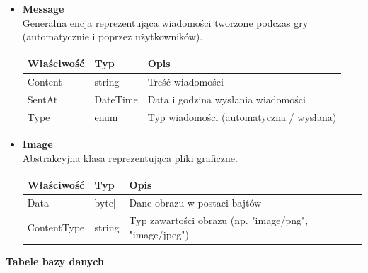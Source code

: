 \documentclass[12pt,a4paper]{article}
\begin{document}
\begin{itemize}
    \item \textbf{Message}\\
    Generalna encja reprezentująca wiadomości tworzone podczas gry (automatycznie i poprzez użytkowników).
    \renewcommand{\arraystretch}{1.5}
    \begin{longtable}{|m{4cm}|m{2cm}|m{8cm}|}
        \hline
        \rowcolor{lightgray}
        \textbf{Właściwość} & \textbf{Typ} & \textbf{Opis} \\ \hline
        \endhead
        \hline
        Content & string & Treść wiadomości \\ \hline
        SentAt & DateTime & Data i godzina wysłania wiadomości \\ \hline
        Type & enum & Typ wiadomości (automatyczna / wysłana) \\ \hline
    \end{longtable}

    \item \textbf{Image}\\
    Abstrakcyjna klasa reprezentująca pliki graficzne.
    \renewcommand{\arraystretch}{1.5}
    \begin{longtable}{|m{4cm}|m{2cm}|m{8cm}|}
        \hline
        \rowcolor{lightgray}
        \textbf{Właściwość} & \textbf{Typ} & \textbf{Opis} \\ \hline
        \endhead
        \hline
        Data & byte[] & Dane obrazu w postaci bajtów \\ \hline
        ContentType & string & Typ zawartości obrazu (np. "image/png", "image/jpeg") \\ \hline
    \end{longtable}
\end{itemize}

\newpage

\noindent \textbf{Tabele bazy danych}\\
\end{document}
